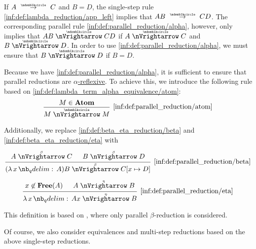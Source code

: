 \begin{definition}
\begin{thmenum}
    If \( A \pred C \) and \( B = D \), the single-step rule \ref{inf:def:lambda_reduction/app_left} implies that \( AB \pred CD \). The corresponding parallel rule \ref{inf:def:parallel_reduction/alpha}, however, only implies that \( AB \ppred CD \) if \( A \ppred C \) and \( B \ppred D \). In order to use \ref{inf:def:parallel_reduction/alpha}, we must ensure that \( B \ppred D \) if \( B = D \).

    Because we have \ref{inf:def:parallel_reduction/alpha}, it is sufficient to ensure that parallel reductions are \hyperref[def:alpha_reflexive]{\( \alpha \)-reflexive}. To achieve this, we introduce the following rule based on \ref{inf:def:lambda_term_alpha_equivalence/atom}:
    \begin{equation*}\taglabel[\ensuremath{ \logic{ParAtom}_{\Anon} }]{inf:def:parallel_reduction/atom}
      \begin{prooftree}
        \hypo{ M \in \op*{Atom} }
        \infer1[\ref{inf:def:parallel_reduction/atom}]{ M \ppred M }
      \end{prooftree}
    \end{equation*}
  \end{thmenum}

   Additionally, we replace \ref{inf:def:beta_eta_reduction/beta} and \ref{inf:def:beta_eta_reduction/eta} with
  \begin{paracol}{2}
    \begin{leftcolumn}
      \begin{equation*}\taglabel[\ensuremath{ \logic{ParRed}_\beta }]{inf:def:parallel_reduction/beta}
        \begin{prooftree}
          \hypo{ A \pbred C }
          \hypo{ B \pbred D }
          \infer2[\ref{inf:def:parallel_reduction/beta}]{ (\qabs x A) B \pbred C[x \mapsto D] }.
        \end{prooftree}
      \end{equation*}
    \end{leftcolumn}

    \begin{rightcolumn}
      \begin{equation*}\taglabel[\ensuremath{ \logic{ParRed}_\eta }]{inf:def:parallel_reduction/eta}
        \begin{prooftree}
          \hypo{ x \not\in \op*{Free}(A) }
          \hypo{ A \pered B }
          \infer2[\ref{inf:def:parallel_reduction/eta}]{ \qabs x A x \pered B }.
        \end{prooftree}
      \end{equation*}
    \end{rightcolumn}
  \end{paracol}
\end{definition}
\begin{comments}
  \item This definition is based on \cite[\S 3.2.3]{Barendregt1984LambdaCalculus}, where only parallel \( \beta \)-reduction is considered.
  \item Of course, we also consider equivalences and multi-step reductions based on the above single-step reductions.
\end{comments}

